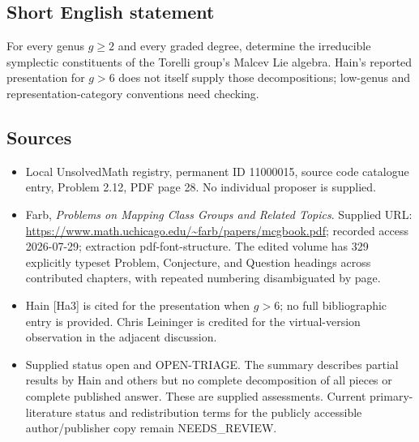 \documentclass[11pt]{article}
\begin{document}
\subsection{Short English statement}
For every genus \(g\geq2\) and every graded degree, determine the irreducible symplectic constituents of the Torelli group's Malcev Lie algebra. Hain's reported presentation for \(g>6\) does not itself supply those decompositions; low-genus and representation-category conventions need checking.
\subsection{Sources}
\begin{itemize}
\item Local UnsolvedMath registry, permanent ID 11000015, source code catalogue entry, Problem 2.12, PDF page 28. No individual proposer is supplied.
\item Farb, \emph{Problems on Mapping Class Groups and Related Topics}. Supplied URL: \url{https://www.math.uchicago.edu/~farb/papers/mcgbook.pdf}; recorded access 2026-07-29; extraction pdf-font-structure. The edited volume has 329 explicitly typeset Problem, Conjecture, and Question headings across contributed chapters, with repeated numbering disambiguated by page.
\item Hain [Ha3] is cited for the presentation when \(g>6\); no full bibliographic entry is provided. Chris Leininger is credited for the virtual-version observation in the adjacent discussion.
\item Supplied status open and OPEN-TRIAGE. The summary describes partial results by Hain and others but no complete decomposition of all pieces or complete published answer. These are supplied assessments. Current primary-literature status and redistribution terms for the publicly accessible author/publisher copy remain NEEDS\_REVIEW.
\end{itemize}
\end{document}

